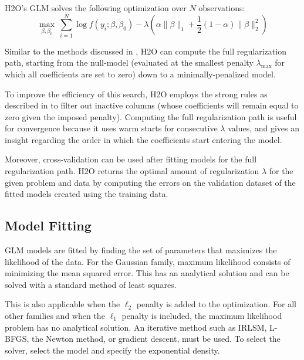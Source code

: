 H2O's GLM  solves the following optimization over $N$ observations:
$$ \max_{\beta,\beta_0}  \  \sum_{i=1}^N \log f\left(y_i ; \beta,\beta_0\right)  - \lambda \left(\alpha \| \beta \|_1 +  \frac{1}{2} (1- \alpha)\| \beta \|_2^2 \right) $$




Similar to the methods discussed in , H2O can compute the full regularization path, starting
from the null-model (evaluated at the smallest penalty $\lambda_{\max}$ for which all coefficients are set to zero) down to a minimally-penalized model. 

To improve the efficiency of this search, 
H2O employs the strong rules as described in  to filter out inactive columns (whose coefficients will remain equal to zero given the imposed penalty). Computing the full regularization path is useful for convergence because it uses warm starts for consecutive $\lambda$ values, and gives an insight regarding the order in which the coefficients start entering the model. 

Moreover, cross-validation can be used after fitting models for the full regularization path. H2O returns the optimal amount of regularization $\lambda$ for the given problem and data by computing the errors on the validation dataset of the fitted models created using the training data.

\newpage
\subsection{Model Fitting}
GLM models are fitted by finding the set of parameters that maximizes the likelihood of the data. For the Gaussian family, maximum likelihood consists of minimizing the mean squared error. This has an analytical solution and can be solved with a standard method of least squares. 

This is also applicable when the $\ell_2$ penalty is added to the optimization.  For all other families and when the $\ell_1$ penalty is included, the maximum likelihood problem has no analytical solution. An iterative method such as IRLSM, L-BFGS, the Newton method, or gradient descent, must be used. To select the solver, select the model and specify the exponential density. 



